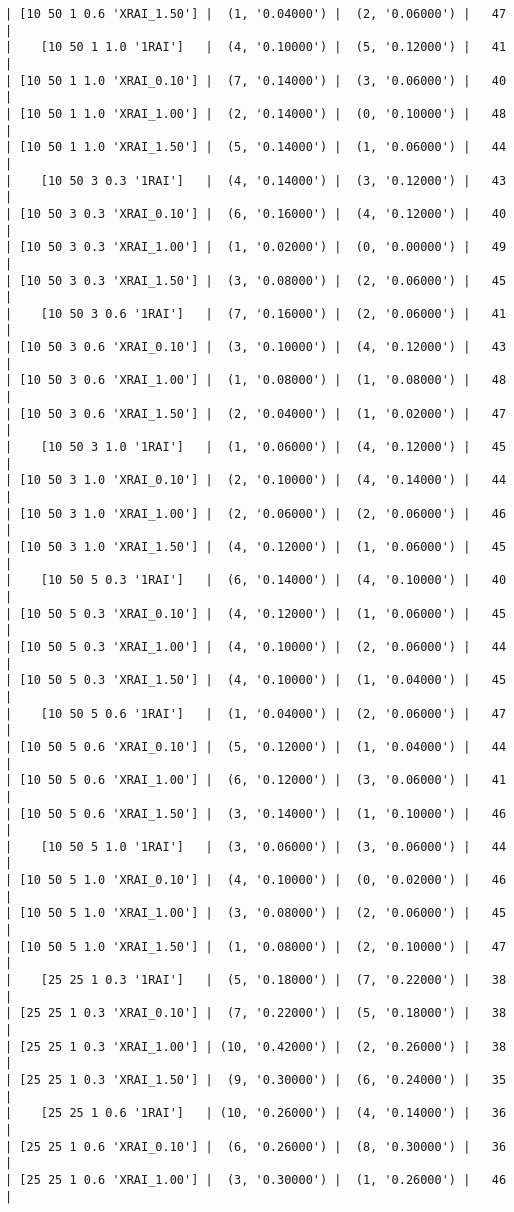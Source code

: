 \documentclass{article}
\begin{document}
\begin{verbatim}
| [10 50 1 0.6 'XRAI_1.50'] |  (1, '0.04000') |  (2, '0.06000') |   47  |
|    [10 50 1 1.0 '1RAI']   |  (4, '0.10000') |  (5, '0.12000') |   41  |
| [10 50 1 1.0 'XRAI_0.10'] |  (7, '0.14000') |  (3, '0.06000') |   40  |
| [10 50 1 1.0 'XRAI_1.00'] |  (2, '0.14000') |  (0, '0.10000') |   48  |
| [10 50 1 1.0 'XRAI_1.50'] |  (5, '0.14000') |  (1, '0.06000') |   44  |
|    [10 50 3 0.3 '1RAI']   |  (4, '0.14000') |  (3, '0.12000') |   43  |
| [10 50 3 0.3 'XRAI_0.10'] |  (6, '0.16000') |  (4, '0.12000') |   40  |
| [10 50 3 0.3 'XRAI_1.00'] |  (1, '0.02000') |  (0, '0.00000') |   49  |
| [10 50 3 0.3 'XRAI_1.50'] |  (3, '0.08000') |  (2, '0.06000') |   45  |
|    [10 50 3 0.6 '1RAI']   |  (7, '0.16000') |  (2, '0.06000') |   41  |
| [10 50 3 0.6 'XRAI_0.10'] |  (3, '0.10000') |  (4, '0.12000') |   43  |
| [10 50 3 0.6 'XRAI_1.00'] |  (1, '0.08000') |  (1, '0.08000') |   48  |
| [10 50 3 0.6 'XRAI_1.50'] |  (2, '0.04000') |  (1, '0.02000') |   47  |
|    [10 50 3 1.0 '1RAI']   |  (1, '0.06000') |  (4, '0.12000') |   45  |
| [10 50 3 1.0 'XRAI_0.10'] |  (2, '0.10000') |  (4, '0.14000') |   44  |
| [10 50 3 1.0 'XRAI_1.00'] |  (2, '0.06000') |  (2, '0.06000') |   46  |
| [10 50 3 1.0 'XRAI_1.50'] |  (4, '0.12000') |  (1, '0.06000') |   45  |
|    [10 50 5 0.3 '1RAI']   |  (6, '0.14000') |  (4, '0.10000') |   40  |
| [10 50 5 0.3 'XRAI_0.10'] |  (4, '0.12000') |  (1, '0.06000') |   45  |
| [10 50 5 0.3 'XRAI_1.00'] |  (4, '0.10000') |  (2, '0.06000') |   44  |
| [10 50 5 0.3 'XRAI_1.50'] |  (4, '0.10000') |  (1, '0.04000') |   45  |
|    [10 50 5 0.6 '1RAI']   |  (1, '0.04000') |  (2, '0.06000') |   47  |
| [10 50 5 0.6 'XRAI_0.10'] |  (5, '0.12000') |  (1, '0.04000') |   44  |
| [10 50 5 0.6 'XRAI_1.00'] |  (6, '0.12000') |  (3, '0.06000') |   41  |
| [10 50 5 0.6 'XRAI_1.50'] |  (3, '0.14000') |  (1, '0.10000') |   46  |
|    [10 50 5 1.0 '1RAI']   |  (3, '0.06000') |  (3, '0.06000') |   44  |
| [10 50 5 1.0 'XRAI_0.10'] |  (4, '0.10000') |  (0, '0.02000') |   46  |
| [10 50 5 1.0 'XRAI_1.00'] |  (3, '0.08000') |  (2, '0.06000') |   45  |
| [10 50 5 1.0 'XRAI_1.50'] |  (1, '0.08000') |  (2, '0.10000') |   47  |
|    [25 25 1 0.3 '1RAI']   |  (5, '0.18000') |  (7, '0.22000') |   38  |
| [25 25 1 0.3 'XRAI_0.10'] |  (7, '0.22000') |  (5, '0.18000') |   38  |
| [25 25 1 0.3 'XRAI_1.00'] | (10, '0.42000') |  (2, '0.26000') |   38  |
| [25 25 1 0.3 'XRAI_1.50'] |  (9, '0.30000') |  (6, '0.24000') |   35  |
|    [25 25 1 0.6 '1RAI']   | (10, '0.26000') |  (4, '0.14000') |   36  |
| [25 25 1 0.6 'XRAI_0.10'] |  (6, '0.26000') |  (8, '0.30000') |   36  |
| [25 25 1 0.6 'XRAI_1.00'] |  (3, '0.30000') |  (1, '0.26000') |   46  |

\end{verbatim}
\end{document}
